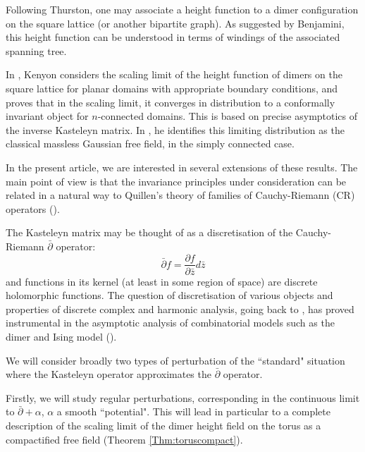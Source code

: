 \documentclass[10pt]{article}
\newcommand{\dbar}{\bar\partial}
\begin{document}
Following Thurston, one may associate a height function to a dimer configuration on the square lattice (or another bipartite graph). As suggested by Benjamini, this height function can be understood in terms of windings of the associated spanning tree.

In \cite{Ken_domino_conformal}, Kenyon considers the scaling limit of the height function of dimers on the square lattice for planar domains with appropriate boundary conditions, and proves that in the scaling limit, it converges in distribution to a conformally invariant object for $n$-connected domains. This is based on precise asymptotics of the inverse Kasteleyn matrix. In \cite{Ken_domino_GFF}, he identifies this limiting distribution as the classical massless Gaussian free field, in the simply connected case. 

In the present article, we are interested in several extensions of these results. The main point of view is that the invariance principles under consideration can be related in a natural way to Quillen's theory of families of Cauchy-Riemann (CR) operators (\cite{Qui}).

The Kasteleyn matrix may be thought of as a discretisation of the Cauchy-Riemann $\dbar$ operator:
$$\dbar f=\frac{\partial f}{\partial \bar z}d\bar z$$
and functions in its kernel (at least in some region of space) are discrete holomorphic functions. The question of discretisation of various objects and properties of discrete complex and harmonic analysis, going back to \cite{Duffin_rhombic}, has proved instrumental in the asymptotic analysis of combinatorial models such as the dimer and Ising model (\cite{Ken_domino_conformal,Smi_ising,Smi_ICM}).

We will consider broadly two types of perturbation of the ``standard" situation where the Kasteleyn operator approximates the $\dbar$ operator.

Firstly, we will study regular perturbations, corresponding in the continuous limit to $\dbar+\alpha$, $\alpha$ a smooth ``potential". This will lead in particular to a complete description of the scaling limit of the dimer height field on the torus as a compactified free field (Theorem \ref{Thm:toruscompact}).
\end{document}
